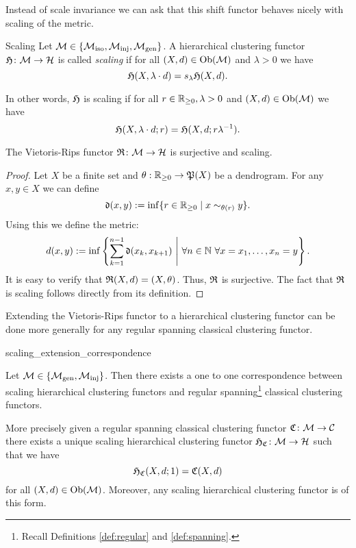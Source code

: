 Instead of scale invariance we can ask that this shift functor behaves nicely with scaling of the metric.

\begin{definition}{Scaling}{}
Let $\mathcal{M} \in \{{\mathcal{M}_\mathrm{iso}},{\mathcal{M}_\mathrm{inj}},{\mathcal{M}_\mathrm{gen}}\}$. A hierarchical clustering functor $\mathfrak{H}\colon \mathcal{M} \to \mathcal{H}$ is called \emph{scaling} if for all ${(X,d) \in \mathrm {Ob}(\mathcal{M})}$ and $\lambda > 0$ we have
$$
\mathfrak{H}(X, \lambda \cdot d) = s_\lambda \mathfrak{H}(X,d).
$$
\end{definition}

In other words, $\mathfrak{H}$ is scaling if for all $r \in \mathbb R_{\geq0}, \lambda > 0$ and $(X,d) \in \mathrm {Ob}(\mathcal{M})$ we have
$$
\mathfrak{H}(X, \lambda \cdot d; r) = \mathfrak{H}(X,d; r \lambda^{-1}).
$$

\begin{proposition}{\cite[Sec.~7.3.1]{Carlsson2010}}{}
The Vietoris-Rips functor $\mathfrak{R}\colon \mathcal{M} \to \mathcal{H}$ is surjective and scaling.
\end{proposition}

\begin{proof}
Let $X$ be a finite set and $\theta: \mathbb R_{\geq0} \to \mathfrak{P}(X)$ be a dendrogram. For any $x,y \in X$ we can define
$$
\mathfrak{d}(x,y) := \inf\{r \in \mathbb R_{\geq0} \mid x \sim_{\theta(r)} y\}.
$$
Using this we define the metric:
$$
d(x,y) := \inf\left\{\sum_{k=1}^{n-1} \mathfrak{d}(x_k, x_{k+1}) \ \Bigg\vert \ \forall n \in \N \ \forall x = x_1, \dots, x_n = y\right\}.
$$
It is easy to verify that $\mathfrak{R}(X,d) = (X,\theta)$. Thus, $\mathfrak{R}$ is surjective. The fact that $\mathfrak{R}$ is scaling follows directly from its definition.
\end{proof}



Extending the Vietoris-Rips functor to a hierarchical clustering functor can be done more generally for any regular spanning classical clustering functor.
\begin{proposition}{}{scaling_extension_correspondence}

Let $\mathcal{M} \in \{{\mathcal{M}_\mathrm{gen}},{\mathcal{M}_\mathrm{inj}}\}$. Then there exists a one to one correspondence between
scaling hierarchical clustering functors and regular spanning\footnote{Recall Definitions \ref{def:regular} and \ref{def:spanning}.} classical clustering functors.

\medskip
More precisely given a regular spanning classical clustering functor $\mathfrak{C}\colon \mathcal{M} \to \mathcal{C}$ there exists a unique scaling hierarchical clustering functor $\mathfrak{H}_{\mathfrak{C}}\colon \mathcal{M} \to \mathcal{H}$ such that we have
$$
\mathfrak{H}_{\mathfrak{C}}(X,d; 1) = \mathfrak{C}(X,d)
$$
for all $(X,d) \in \mathrm {Ob}(\mathcal{M})$.
Moreover, any scaling hierarchical clustering functor is of this form.
\end{proposition}


